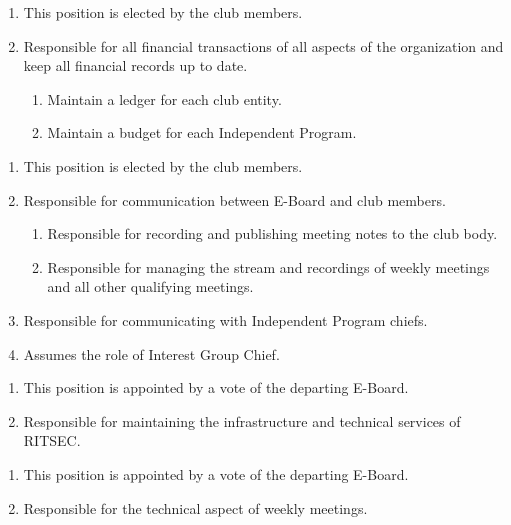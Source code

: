 
\begin{enumerate}
  \item This position is elected by the club members.
  \item Responsible for all financial transactions of all aspects of the
    organization and keep all financial records up to date.
  \begin{enumerate}
    \item Maintain a ledger for each club entity.
    \item Maintain a budget for each Independent Program.
  \end{enumerate}
\end{enumerate}


\begin{enumerate}
  \item This position is elected by the club members.
  \item Responsible for communication between E-Board and club members.
  \begin{enumerate}
    \item Responsible for recording and publishing meeting notes to the club
      body.
    \item Responsible for managing the stream and recordings of weekly meetings
      and all other qualifying meetings.
  \end{enumerate}
  \item Responsible for communicating with Independent Program chiefs.
  \item Assumes the role of Interest Group Chief.
\end{enumerate}


\begin{enumerate}
  \item This position is appointed by a vote of the departing E-Board.
  \item Responsible for maintaining the infrastructure and technical services
    of RITSEC.
\end{enumerate}


\begin{enumerate}
  \item This position is appointed by a vote of the departing E-Board.
  \item Responsible for the technical aspect of weekly meetings.
\end{enumerate}